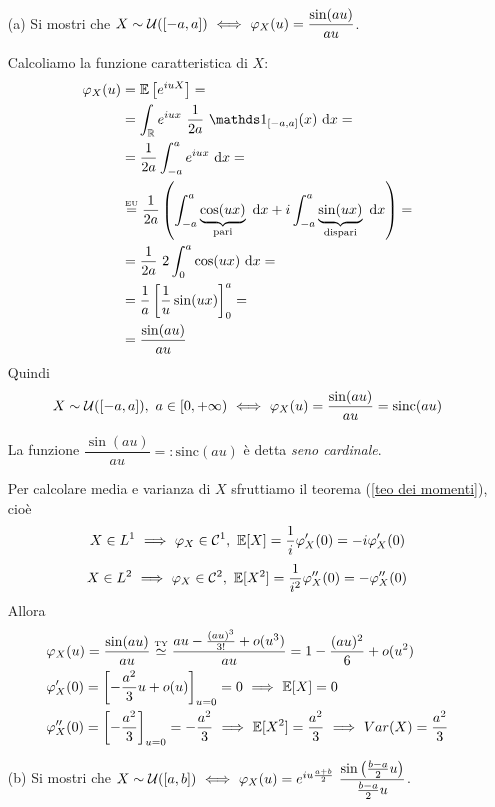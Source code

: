 \Soluzione{} %
\begin{enumerate}
\item [(a)] Si mostri che $X\sim \mathcal{U}([-a,a])\ \Longleftrightarrow\ \varphi_X(u)=\dfrac{\sin(au)}{au}$.

Calcoliamo la funzione caratteristica di $X$:
\begin{gather*}
\begin{aligned}
\varphi_X(u)&=\EE\left[e^{iuX}  \right]=\\
&=\int_\RR e^{iux}\ \frac{1}{2a}\ \Ind_{[-a,a]}(x)\dx=\\
&=\frac{1}{2a}\int_{-a}^ae^{iux}\dx=\\
&\overset{\underset{\text{EU}}{}}{=}\frac{1}{2a}\left(\int_{-a}^a\underbrace{\cos(ux)}_{\text{pari}}\dx+i\int_{-a}^a\underbrace{\sin(ux)}_{\text{dispari}}\dx  \right)=\\
&=\frac{1}{2a}\ 2\int_{0}^a\cos(ux)\dx=\\
&=\frac{1}{a}\left[\frac{1}{u} \sin(ux)  \right]_0^a=\\
&=\frac{\sin(au)}{au}
\end{aligned}
\end{gather*}
Quindi
\[
X\sim \UUU([-a,a]),\ a\in[0,+\infty)\SESOLOSE\varphi_X(u)=\frac{\sin(au)}{au}=\text{sinc}(au)
\]
\begin{oss}
La funzione $\dfrac{\sin(au)}{au}=:\text{sinc}(au)$ è detta \emph{seno cardinale}.
\end{oss}
Per calcolare media e varianza di $X$ sfruttiamo il teorema (\ref{teo dei momenti}), cioè
\[
X\in L^1\SE\varphi_X\in\Cu,\ \EE[X]=\frac{1}{i}\varphi_X'(0)=-i\varphi_X'(0)
\]
\[
X\in L^2\SE\varphi_X\in\mathcal{C}^2,\ \EE[X^2]=\frac{1}{i^2}\varphi_X''(0)=-\varphi_X''(0)
\]
Allora
\begin{gather*}
\begin{aligned}
&\varphi_X(u)=\frac{\sin(au)}{au}\overset{\underset{\text{TY}}{}}{\simeq}\frac{au-\frac{(au)^3}{3!}+o(u^3)}{au}=1-\frac{(au)^2}{6}+o(u^2) \\
&\varphi_X'(0)=\left[-\frac{a^2}{3}u+o(u) \right]_{u=0}=0\ \Longrightarrow\ \mathbb{E}[X]=0\\
&\varphi_X''(0)=\left[-\frac{a^2}{3} \right]_{u=0}=-\frac{a^2}{3}\ \Longrightarrow\ \mathbb{E}[X^2]=\frac{a^2}{3}\ \Longrightarrow\  Var(X)=\frac{a^2}{3}\\
\end{aligned}
\end{gather*}

\item [(b)] Si mostri che $X\sim  \UUU([a,b])\SESOLOSE\varphi_X(u)=e^{iu\frac{a+b}{2}}\ \dfrac{\sin\left(\frac{b-a}{2}u\right)}{\frac{b-a}{2}u}$.


\end{enumerate}
